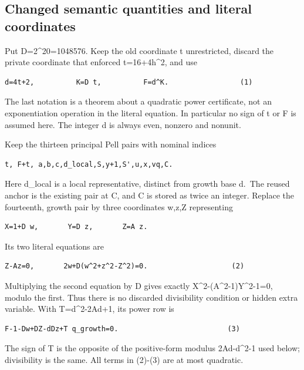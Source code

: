 \subsection{Changed semantic quantities and literal
coordinates}\label{changed-semantic-quantities-and-literal-coordinates}

Put D=2\^{}20=1048576. Keep the old coordinate t unrestricted, discard
the private coordinate that enforced t=16+4h\^{}2, and use

\begin{verbatim}
d=4t+2,          K=D t,          F=d^K.                 (1)
\end{verbatim}

The last notation is a theorem about a quadratic power certificate, not
an exponentiation operation in the literal equation. In particular no
sign of t or F is assumed here. The integer d is always even, nonzero
and nonunit.

Keep the thirteen principal Pell pairs with nominal indices

\begin{verbatim}
t, F+t, a,b,c,d_local,S,y+1,S',u,x,vq,C.
\end{verbatim}

Here d\_local is a local representative, distinct from growth base
d.~The reused anchor is the existing pair at C, and C is stored as twice
an integer. Replace the fourteenth, growth pair by three coordinates
w,z,Z representing

\begin{verbatim}
X=1+D w,       Y=D z,       Z=A z.
\end{verbatim}

Its two literal equations are

\begin{verbatim}
Z-Az=0,       2w+D(w^2+z^2-Z^2)=0.                    (2)
\end{verbatim}

Multiplying the second equation by D gives exactly
X\^{}2-(A\^{}2-1)Y\^{}2-1=0, modulo the first. Thus there is no
discarded divisibility condition or hidden extra variable. With
T=d\^{}2-2Ad+1, its power row is

\begin{verbatim}
F-1-Dw+DZ-dDz+T q_growth=0.                          (3)
\end{verbatim}

The sign of T is the opposite of the positive-form modulus 2Ad-d\^{}2-1
used below; divisibility is the same. All terms in (2)-(3) are at most
quadratic.

